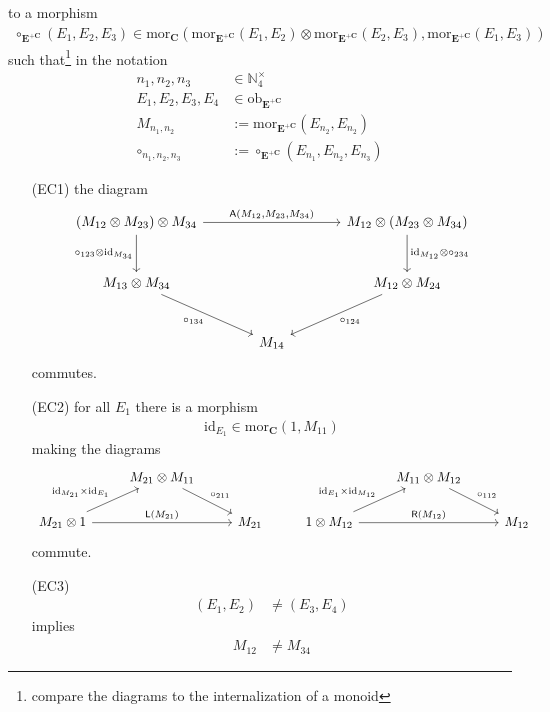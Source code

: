 to a morphism
\begin{align*}
  \circ_{\mathbf{E}^{+\mathbf{C}}}(E_{1},E_{2},E_{3})
  \in
  \mathrm{mor}_{\mathbf{C}}
  \left(
    \mathrm{mor}_{\mathbf{E}^{+\mathbf{C}}}(E_{1},E_{2})
    \otimes
    \mathrm{mor}_{\mathbf{E}^{+\mathbf{C}}}(E_{2},E_{3}),
    \mathrm{mor}_{\mathbf{E}^{+\mathbf{C}}}(E_{1},E_{3})
  \right)
\end{align*}
such that\footnote{compare the diagrams to the internalization of a monoid} in the notation
\begin{align*}
  n_{1},
  n_{2},
  n_{3}
  &\in
  \mathbb{N}_{4}^{\times}
  \\
  E_{1},
  E_{2},
  E_{3},
  E_{4}
  &\in
  \mathrm{ob}_{\mathbf{E}^{+\mathbf{C}}}
  \\
  M_{n_{1},n_{2}}
  &:=
  \mathrm{mor}_{\mathbf{E}^{+\mathbf{C}}}(E_{n_{2}},E_{n_{2}})
  \\
  \circ_{n_{1},n_{2},n_{3}}
  &:=
  \circ_{\mathbf{E}^{+\mathbf{C}}}(E_{n_{1}},E_{n_{2}},E_{n_{3}})
\end{align*}
\begin{enumerate}
\item[(EC1)]
the diagram
\[
\begin{tikzcd}[sep=large]
  \left(
    M_{12}
    \otimes
    M_{23}
  \right)
  \otimes
  M_{34}
  \arrow{rr}{\mathsf{A}(M_{12},M_{23},M_{34})}
  \arrow[swap]{d}{\circ_{123} \otimes \mathrm{id}_{M_{34}}}
  &
  &
  M_{12}
  \otimes
  \left(
    M_{23}
    \otimes
    M_{34}
  \right)
  \arrow{d}{\mathrm{id}_{M_{12}} \otimes \circ_{234}}
  \\
  M_{13}
  \otimes
  M_{34}
  \arrow[swap]{dr}{\circ_{134}}
  &
  &
  M_{12}
  \otimes
  M_{24}
  \arrow{dl}{\circ_{124}}
  \\
  &
  M_{14}
  &
\end{tikzcd}
\]
commutes.
\item[(EC2)]
for all $E_{1}$ there is a morphism
\begin{align*}
  \mathrm{id}_{E_{1}}
  \in
  \mathrm{mor}_{\mathbf{C}}(1,M_{11})
\end{align*}
making the diagrams
\[
\begin{tikzcd}[sep=normal]
  &
  M_{21}
  \otimes
  M_{11}
  \arrow{dr}{\circ_{211}}
  &
  &
  &
  M_{11}
  \otimes
  M_{12}
  \arrow{dr}{\circ_{112}}
  &
  \\
  M_{21}
  \otimes
  1
  \arrow{ur}{\mathrm{id}_{M_{21}} \times \mathrm{id}_{E_{1}}}
  \arrow{rr}{\mathsf{L}(M_{21})}
  &
  &
  M_{21}
  &
  1
  \otimes
  M_{12}
  \arrow{ur}{\mathrm{id}_{E_{1}} \times \mathrm{id}_{M_{12}}}
  \arrow{rr}{\mathsf{R}(M_{12})}
  &
  &
  M_{12}
\end{tikzcd}
\]
commute.
\item[(EC3)]
\begin{align*}
  (E_{1},E_{2})
  &\neq
  (E_{3},E_{4})
\end{align*}
implies
\begin{align*}
  M_{12}
  &\neq
  M_{34}
\end{align*}
\end{enumerate}
